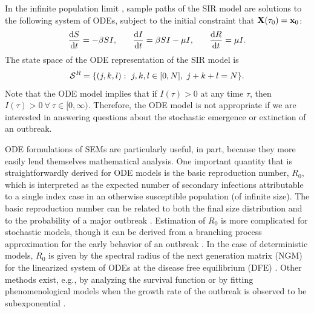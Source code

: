 In the infinite population limit , sample paths of the SIR model are solutions to the following system of ODEs, subject to the initial constraint that $ \mathbf{X}(\tau_0) = \mathbf{x}_0 $:
\begin{align*}
\frac{\mathrm{d} S}{\mathrm{d} t} = -\beta S I,\hspace{0.25in} 
\frac{\mathrm{d} I}{\mathrm{d} t} = \beta S I - \mu I,\hspace{0.25in} 
\frac{\mathrm{d} R}{\mathrm{d} t} = \mu I.
\end{align*}
The state space of the ODE representation of the SIR model is $$ \mcS^R =  \lbrace(j,k,l):\ j,k,l\in[0,N],\  j+k+l = N\rbrace. $$ Note that the ODE model implies that if $ I(\tau) > 0 $ at any time $ \tau $, then $ I(\tau) > 0\ \forall\ \tau\in[0,\infty)$. Therefore, the ODE model is not appropriate if we are interested in answering questions about the stochastic emergence or extinction of an outbreak.

ODE formulations of SEMs are particularly useful, in part, because they more easily lend themselves mathematical analysis. One important quantity that is straightforwardly derived for ODE models is the basic reproduction number, $ R_0 $, which is interpreted as the expected number of secondary infections attributable to a single index case in an otherwise susceptible population (of infinite size). The basic reproduction number can be related to both the final size distribution and to the probability of a major outbreak \cite{allen2017primer,greenwood2009stochastic,miller2012note}. Estimation of $ R_0 $ is more complicated for stochastic models, though it can be derived from a branching process approximation for the early behavior of an outbreak \cite{allen2008introduction}. In the case of deterministic models, $ R_0 $ is given by the spectral radius of the next generation matrix (NGM) for the linearized system of ODEs at the disease free equilibrium (DFE) \cite{diekmann2009construction,van2017reproduction}. Other methods exist, e.g., by analyzing the survival function or by fitting phenomenological models when the growth rate of the outbreak is observed to be subexponential \cite{van2017reproduction}.

